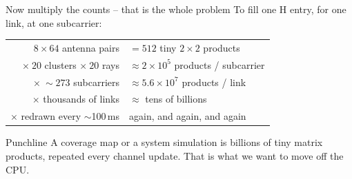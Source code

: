 \documentclass[aspectratio=169,11pt]{beamer}
\begin{document}
\begin{frame}{Now multiply the counts -- that is the whole problem}
  To fill \alert{one} H entry, for \alert{one} link, at \alert{one} subcarrier:
  \vspace{0.3em}
  \begin{center}\small
  \begin{tabular}{rl}
    $8\times64$ antenna pairs & $=512$ tiny $2{\times}2$ products\\
    $\times\ 20$ clusters $\times\ 20$ rays & $\approx 2\times10^{5}$ products / subcarrier\\
    $\times\ \sim\!273$ subcarriers & $\approx 5.6\times10^{7}$ products / link\\
    $\times$ thousands of links & $\approx$ \alert{tens of billions}\\
    $\times$ redrawn every $\sim$100\,ms & \alert{again, and again, and again}\\
  \end{tabular}
  \end{center}
  \vspace{0.4em}
  \begin{block}{Punchline}
    A coverage map or a system simulation is \alert{billions of tiny matrix
    products}, repeated every channel update. That is what we want to move off
    the CPU.
  \end{block}
\end{frame}
\end{document}
